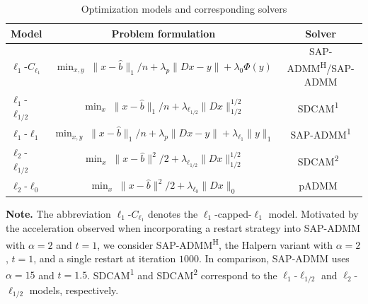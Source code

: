 \begin{table}[h]
\centering
\footnotesize
\caption{Optimization models and corresponding solvers}
\label{tab:models_algorithms}
\begin{tabular}{@{} l c c @{}}
\toprule
\textbf{Model} & \textbf{Problem formulation} & \textbf{Solver} \\
\midrule
\(\ell_1\)-\(C_{\ell_1}\)
&
$
\min_{x,y}\;
\|x-\hat b\|_1/n
+\lambda_p\|Dx-y\|
+\lambda_0\Phi(y)
$
&
SAP-ADMM\textsuperscript{H}/SAP-ADMM
\\
\midrule
\(\ell_1\)-\(\ell_{1/2}\)
&
$
\min_x\;
\|x-\hat b\|_1/n
+\lambda_{\ell_{1/2}}\|Dx\|_{1/2}^{1/2}
$
&
SDCAM\textsuperscript{1}~\cite{L2019A}
\\
\midrule
\(\ell_1\)-\(\ell_1\)
&
$
\min_{x,y}\;
\|x-\hat b\|_1/n
+\lambda_p\|Dx-y\|
+\lambda_{\ell_1}\|y\|_1
$
&
SAP-ADMM\textsuperscript{1}
\\
\midrule
\(\ell_2\)-\(\ell_{1/2}\)
&
$
\min_x\;
\|x-\hat b\|^2/2
+\lambda_{\ell_{1/2}}\|Dx\|_{1/2}^{1/2}
$
&
SDCAM\textsuperscript{2}~\cite{L2019A}
\\
\midrule
\(\ell_2\)-\(\ell_0\)
&
$
\min_x\;
\|x-\hat b\|^2/2
+\lambda_{\ell_0}\|Dx\|_0
$
&
pADMM~\cite{bot2020The}
\\
\bottomrule
\end{tabular}

\vspace{2pt}
\begin{minipage}{0.98\linewidth}
\footnotesize
\textbf{Note.}
The abbreviation \(\ell_1\)-\(C_{\ell_1}\) denotes the
\(\ell_1\)-capped-\(\ell_1\) model. Motivated by the acceleration observed when incorporating a restart
strategy into SAP-ADMM with $\alpha=2$ and $t=1$, we consider
SAP-ADMM\textsuperscript{H}, the Halpern variant with $\alpha=2$, $t=1$,
and a single restart at iteration $1000$. In comparison, SAP-ADMM
uses $\alpha=15$ and $t=1.5$. SDCAM\textsuperscript{1} and SDCAM\textsuperscript{2}
correspond to the $\ell_1$-$\ell_{1/2}$ and
$\ell_2$-$\ell_{1/2}$ models, respectively.
\end{minipage}
\end{table}


